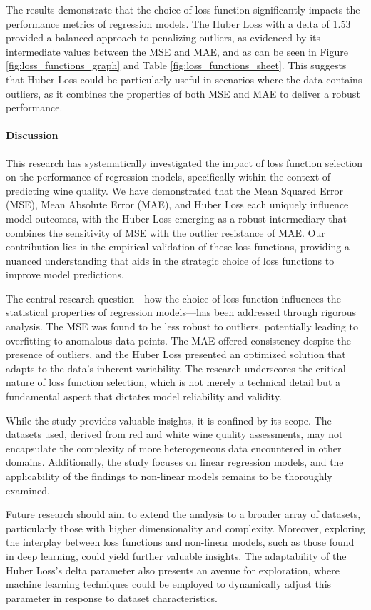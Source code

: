 \documentclass[12pt]{article}
\begin{document}
The results demonstrate that the choice of loss function significantly impacts the performance metrics of regression models. The Huber Loss with a delta of 1.53 provided a balanced approach to penalizing outliers, as evidenced by its intermediate values between the MSE and MAE, and as can be seen in Figure \ref{fig:loss_functions_graph} and Table \ref{fig:loss_functions_sheet}. This suggests that Huber Loss could be particularly useful in scenarios where the data contains outliers, as it combines the properties of both MSE and MAE to deliver a robust performance.


\paragraph{Discussion}

This research has systematically investigated the impact of loss function selection on the performance of regression models, specifically within the context of predicting wine quality. We have demonstrated that the Mean Squared Error (MSE), Mean Absolute Error (MAE), and Huber Loss each uniquely influence model outcomes, with the Huber Loss emerging as a robust intermediary that combines the sensitivity of MSE with the outlier resistance of MAE. Our contribution lies in the empirical validation of these loss functions, providing a nuanced understanding that aids in the strategic choice of loss functions to improve model predictions.


The central research question—how the choice of loss function influences the statistical properties of regression models—has been addressed through rigorous analysis. The MSE was found to be less robust to outliers, potentially leading to overfitting to anomalous data points. The MAE offered consistency despite the presence of outliers, and the Huber Loss presented an optimized solution that adapts to the data's inherent variability. The research underscores the critical nature of loss function selection, which is not merely a technical detail but a fundamental aspect that dictates model reliability and validity.


While the study provides valuable insights, it is confined by its scope. The datasets used, derived from red and white wine quality assessments, may not encapsulate the complexity of more heterogeneous data encountered in other domains. Additionally, the study focuses on linear regression models, and the applicability of the findings to non-linear models remains to be thoroughly examined.


Future research should aim to extend the analysis to a broader array of datasets, particularly those with higher dimensionality and complexity. Moreover, exploring the interplay between loss functions and non-linear models, such as those found in deep learning, could yield further valuable insights. The adaptability of the Huber Loss's delta parameter also presents an avenue for exploration, where machine learning techniques could be employed to dynamically adjust this parameter in response to dataset characteristics.




\end{document}
